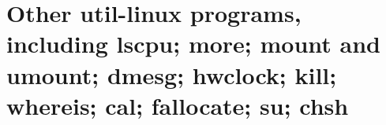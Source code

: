 
\chapter{Other util-linux programs, including lscpu; more; mount and umount; dmesg; hwclock; kill; whereis; cal; fallocate; su; chsh}
